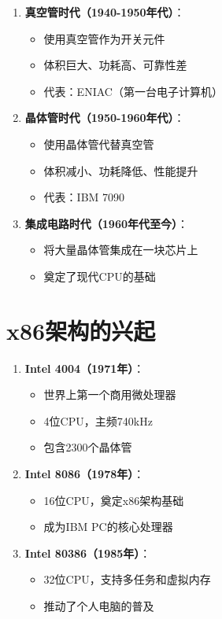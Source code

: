 \documentclass[12pt,UTF8]{ctexbook}
\begin{document}
\begin{enumerate}
    \item \textbf{真空管时代（1940-1950年代）}：
    \begin{itemize}[leftmargin=2em]
        \item 使用真空管作为开关元件
        \item 体积巨大、功耗高、可靠性差
        \item 代表：ENIAC（第一台电子计算机）
    \end{itemize}
    
    \item \textbf{晶体管时代（1950-1960年代）}：
    \begin{itemize}[leftmargin=2em]
        \item 使用晶体管代替真空管
        \item 体积减小、功耗降低、性能提升
        \item 代表：IBM 7090
    \end{itemize}
    
    \item \textbf{集成电路时代（1960年代至今）}：
    \begin{itemize}[leftmargin=2em]
        \item 将大量晶体管集成在一块芯片上
        \item 奠定了现代CPU的基础
    \end{itemize}
\end{enumerate}

\section{x86架构的兴起}

\begin{enumerate}
    \item \textbf{Intel 4004（1971年）}：
    \begin{itemize}[leftmargin=2em]
        \item 世界上第一个商用微处理器
        \item 4位CPU，主频740kHz
        \item 包含2300个晶体管
    \end{itemize}
    
    \item \textbf{Intel 8086（1978年）}：
    \begin{itemize}[leftmargin=2em]
        \item 16位CPU，奠定x86架构基础
        \item 成为IBM PC的核心处理器
    \end{itemize}
    
    \item \textbf{Intel 80386（1985年）}：
    \begin{itemize}[leftmargin=2em]
        \item 32位CPU，支持多任务和虚拟内存
        \item 推动了个人电脑的普及
    \end{itemize}
\end{enumerate}
\end{document}
